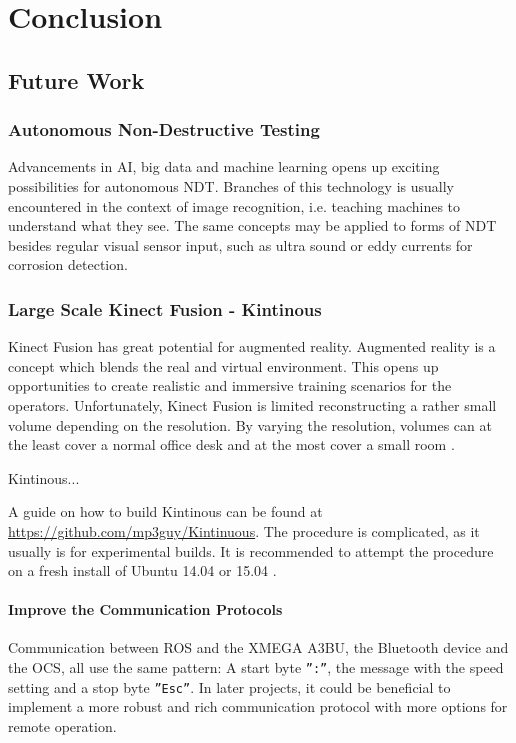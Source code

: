 \chapter{Conclusion}
\label{chp:conclusion} 

\section{Future Work}

\subsection{Autonomous Non-Destructive Testing}

Advancements in \ac{AI}, big data and machine learning opens up exciting possibilities for autonomous \ac{NDT}. Branches of this technology is usually encountered in the context of image recognition, i.e. teaching machines to understand what they see. The same concepts may be applied to forms of \ac{NDT} besides regular visual sensor input, such as ultra sound or eddy currents for corrosion detection.  

\subsection{Large Scale Kinect Fusion - Kintinous}

Kinect Fusion has great potential for augmented reality. Augmented reality is a concept which blends the real and virtual environment. This opens up opportunities to create realistic and immersive training scenarios for the operators. Unfortunately, Kinect Fusion is limited reconstructing a rather small volume depending on the resolution. By varying the resolution, volumes can at the least cover a normal office desk and at the most cover a small room \cite{keylist}.  

Kintinous...

A guide on how to build Kintinous can be found  at \href{Github}{https://github.com/mp3guy/Kintinuous}. The procedure is complicated, as it usually is for experimental builds. It is recommended to attempt the procedure on a fresh install of Ubuntu 14.04 or 15.04 \cite{Kintinous}.

\subsubsection{Improve the Communication Protocols}

Communication between \ac{ROS} and the XMEGA A3BU, the Bluetooth device and the \ac{OCS}, all use the same pattern: A start byte \texttt{'':''}, the message with the speed setting and a stop byte \texttt{''Esc''}. In later projects, it could be beneficial to implement a more robust and rich communication protocol with more options for remote operation. 

